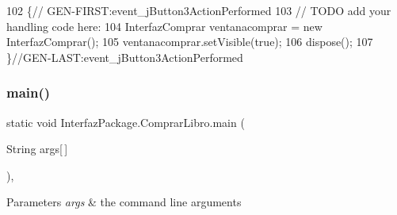 \begin{DoxyCode}
102                                                                          \{\textcolor{comment}{//
      GEN-FIRST:event\_jButton3ActionPerformed}
103         \textcolor{comment}{// TODO add your handling code here:}
104         InterfazComprar ventanacomprar = \textcolor{keyword}{new} InterfazComprar();
105         ventanacomprar.setVisible(\textcolor{keyword}{true});
106         dispose();
107     \}\textcolor{comment}{//GEN-LAST:event\_jButton3ActionPerformed}
\end{DoxyCode}
\mbox{\label{class_interfaz_package_1_1_comprar_libro_a7459e903a1ffbe1b8e163dccfe5dba44}} 
\subsubsection{\texorpdfstring{main()}{main()}}
{\footnotesize\ttfamily static void Interfaz\+Package.\+Comprar\+Libro.\+main (\begin{DoxyParamCaption}\item[{String}]{args\mbox{[}$\,$\mbox{]} }\end{DoxyParamCaption})\hspace{0.3cm}{\ttfamily [inline]}, {\ttfamily [static]}}


\begin{DoxyParams}{Parameters}
{\em args} & the command line arguments \\
\hline
\end{DoxyParams}

